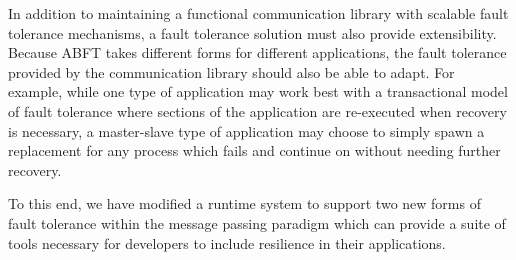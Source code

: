 In addition to maintaining a functional communication library with scalable fault tolerance mechanisms, a fault tolerance solution must also provide extensibility. Because ABFT takes different forms for different applications, the fault tolerance provided by the communication library should also be able to adapt. For example, while one type of application may work best with a transactional model of fault tolerance where sections of the application are re-executed when recovery is necessary, a master-slave type of application may choose to simply spawn a replacement for any process which fails and continue on without needing further recovery.

To this end, we have modified a runtime system to support two new forms of fault tolerance within the message passing paradigm which can provide a suite of tools necessary for developers to include resilience in their applications.